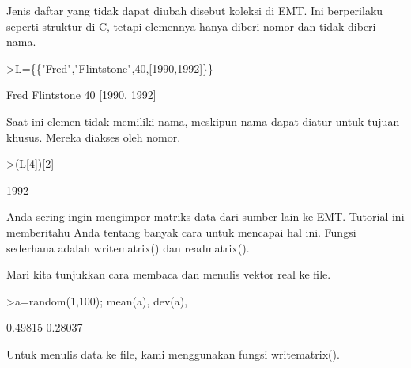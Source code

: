 \documentclass[a4paper,10pt]{article}
\begin{document}
\begin{eulernotebook}
\begin{eulercomment}
\begin{eulercomment}
\begin{eulercomment}
\begin{eulercomment}
\begin{eulercomment}
\begin{eulercomment}
\begin{eulercomment}
\begin{eulercomment}
\begin{eulercomment}
\begin{eulercomment}
\begin{eulercomment}
\begin{eulercomment}
\begin{eulercomment}
\begin{eulercomment}
\begin{eulercomment}
\begin{eulercomment}
\begin{eulercomment}
\begin{eulercomment}
\begin{eulercomment}
Jenis daftar yang tidak dapat diubah disebut koleksi di EMT. Ini
berperilaku seperti struktur di C, tetapi elemennya hanya diberi nomor
dan tidak diberi nama.
\end{eulercomment}
\begin{eulerprompt}
>L=\{\{"Fred","Flintstone",40,[1990,1992]\}\}
\end{eulerprompt}
\begin{euleroutput}
  Fred
  Flintstone
  40
  [1990,  1992]
\end{euleroutput}
\begin{eulercomment}
Saat ini elemen tidak memiliki nama, meskipun nama dapat diatur untuk
tujuan khusus. Mereka diakses oleh nomor.
\end{eulercomment}
\begin{eulerprompt}
>(L[4])[2]
\end{eulerprompt}
\begin{euleroutput}
  1992
\end{euleroutput}
\begin{eulercomment}
Anda sering ingin mengimpor matriks data dari sumber lain ke EMT.
Tutorial ini memberitahu Anda tentang banyak cara untuk mencapai hal
ini. Fungsi sederhana adalah writematrix() dan readmatrix().

Mari kita tunjukkan cara membaca dan menulis vektor real ke file.
\end{eulercomment}
\begin{eulerprompt}
>a=random(1,100); mean(a), dev(a),
\end{eulerprompt}
\begin{euleroutput}
  0.49815
  0.28037
\end{euleroutput}
\begin{eulercomment}
Untuk menulis data ke file, kami menggunakan fungsi writematrix().


\end{eulercomment}
\end{eulercomment}
\end{eulercomment}
\end{eulercomment}
\end{eulercomment}
\end{eulercomment}
\end{eulercomment}
\end{eulercomment}
\end{eulercomment}
\end{eulercomment}
\end{eulercomment}
\end{eulercomment}
\end{eulercomment}
\end{eulercomment}
\end{eulercomment}
\end{eulercomment}
\end{eulercomment}
\end{eulercomment}
\end{eulercomment}
\end{eulernotebook}
\end{document}
